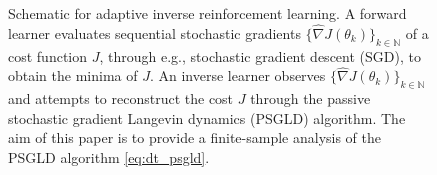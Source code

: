 \documentclass[journal,onecolumn]{IEEEtran}
\newcommand{\thk}{\theta_k}
\newcommand{\thkk}{\theta_{k+1}}
\newcommand{\step}{\epsilon}
\newcommand{\gradn}{\hat{\nabla}}
\newcommand{\rew}{J}
\newcommand{\CE}{\mathbb{E}}
\newcommand{\N}{\mathbb{N}}
\begin{document}
\begin{figure}[h!]
    \centering
    \caption{\small Schematic for adaptive inverse reinforcement learning. A forward learner evaluates sequential stochastic gradients $\{\gradn\rew(\thk)\}_{k\in\N}$ of a cost function $\rew$, through e.g., stochastic gradient descent (SGD), to obtain the minima of $\rew$. An inverse learner observes $\{\gradn\rew(\thk)\}_{k\in\N}$ and attempts to reconstruct the cost $\rew$ through the passive stochastic gradient Langevin dynamics (PSGLD) algorithm. The aim of this paper is to provide a finite-sample analysis of the PSGLD algorithm \eqref{eq:dt_psgld}. 
    }\label{fig:IRLblockdiag}
\end{figure}
\end{document}
